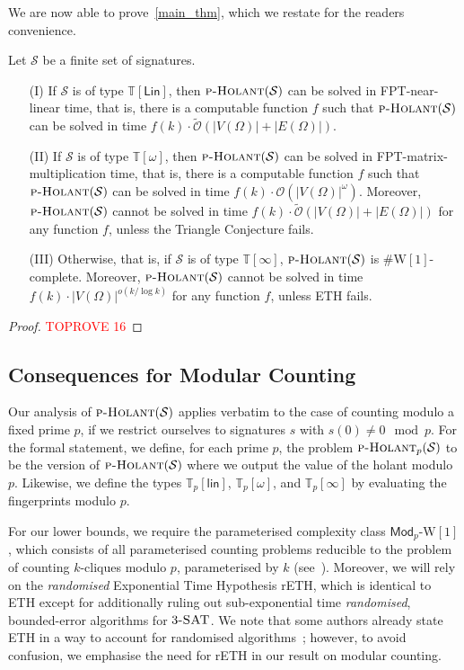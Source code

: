 \documentclass[authorcolumns,numberwithinsect]{no-lipics-v2022}
\newcommand{\W}{\mathrm{W}}
\newcommand{\holantprob}{\text{\sc{p-Holant}}}
\begin{document}
We are now able to prove~\cref{main_thm}, which we restate for the readers convenience.
\begin{theorem}
    Let $\mathcal{S}$ be a finite set of signatures.
    \begin{itemize}
        \item[(I)] If $\mathcal{S}$ is of type $\mathbb{T}[\mathsf{Lin}]$, then $\textsc{p-Holant}(\mathcal{S})$ can be solved in FPT-near-linear time, that is, there is a computable function $f$ such that $\textsc{p-Holant}(\mathcal{S})$ can be solved in time $f(k)\cdot \tilde{\mathcal{O}}(|V(\Omega)|+|E(\Omega)|)$.
        \item[(II)] If $\mathcal{S}$ is of type $\mathbb{T}[\omega]$, then $\textsc{p-Holant}(\mathcal{S})$ can be solved in FPT-matrix-multiplication time, that is, there is a computable function $f$ such that $\textsc{p-Holant}(\mathcal{S})$ can be solved in time $f(k)\cdot \mathcal{O}(|V(\Omega)|^{\omega})$. Moreover, $\textsc{p-Holant}(\mathcal{S})$ cannot be solved in time $f(k)\cdot \tilde{\mathcal{O}}(|V(\Omega)|+|E(\Omega)|)$ for any function $f$, unless the Triangle Conjecture fails.
        \item[(III)] Otherwise, that is, if $\mathcal{S}$ is of type $\mathbb{T}[\infty]$, $\textsc{p-Holant}(\mathcal{S})$ is $\#\W[1]$-complete. Moreover, $\textsc{p-Holant}(\mathcal{S})$ cannot be solved in time $f(k)\cdot |V(\Omega)|^{o(k/\log k)}$ for any function $f$, unless ETH fails. 
    \end{itemize}
\end{theorem}
\begin{proof}\textcolor{red}{TOPROVE 16}\end{proof}

\subsection{Consequences for Modular Counting}\label{sec:modular}
Our analysis of $\holantprob(\mathcal{S})$ applies verbatim to the case of counting modulo a fixed prime $p$, if we restrict ourselves to signatures $s$ with $s(0)\neq 0\mod p$. For the formal statement, we define, for each prime $p$, the problem $\holantprob_p(\mathcal{S})$ to be the version of $\holantprob(\mathcal{S})$ where we output the value of the holant modulo $p$. Likewise, we define the types $\mathbb{T}_p[\mathsf{lin}]$, $\mathbb{T}_p[\omega]$, and $\mathbb{T}_p[\infty]$ by evaluating the fingerprints modulo $p$.

For our lower bounds, we require the parameterised complexity class $\mathsf{Mod}_p\text{-}\W[1]$, which consists of all parameterised counting problems reducible to the problem of counting $k$-cliques modulo $p$, parameterised by $k$ (see~\cite{CurticapeanDH21}). Moreover, we will rely on the \emph{randomised} Exponential Time Hypothesis rETH, which is identical to ETH except for additionally ruling out sub-exponential time \emph{randomised}, bounded-error algorithms for $3\textsc{-SAT}$. We note that some authors already state ETH in a way to account for randomised algorithms~\cite{CurticapeanDH21}; however, to avoid confusion, we emphasise the need for rETH in our result on modular counting. 
\end{document}
